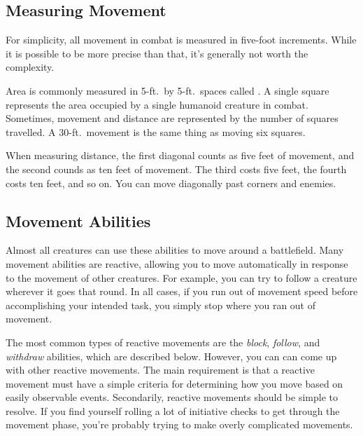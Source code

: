     \subsection{Measuring Movement}

        For simplicity, all movement in combat is measured in five-foot increments.
        While it is possible to be more precise than that, it's generally not worth the complexity.

         Area is commonly measured in 5-ft.\ by 5-ft.\ spaces called .
        A single square represents the area occupied by a single humanoid creature in combat.
        Sometimes, movement and distance are represented by the number of squares travelled.
        A 30-ft.\ movement is the same thing as moving six squares.

         When measuring distance, the first diagonal counts as five feet of movement, and the second counds as ten feet of movement.
        The third costs five feet, the fourth costs ten feet, and so on.
        You can move diagonally past corners and enemies.

    \subsection{Movement Abilities}\label{Movement Abilities}

        Almost all creatures can use these abilities to move around a battlefield.
        Many movement abilities are reactive, allowing you to move automatically in response to the movement of other creatures.
        For example, you can try to follow a creature wherever it goes that round.
        In all cases, if you run out of movement speed before accomplishing your intended task, you simply stop where you ran out of movement.

        The most common types of reactive movements are the \textit{block}, \textit{follow}, and \textit{withdraw} abilities, which are described below.
        However, you can can come up with other reactive movements.
        The main requirement is that a reactive movement must have a simple criteria for determining how you move based on easily observable events.
        Secondarily, reactive movements should be simple to resolve.
        If you find yourself rolling a lot of initiative checks to get through the movement phase, you're probably trying to make overly complicated movements.

